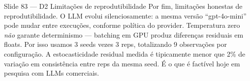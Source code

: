 \documentclass[aspectratio=169,10pt]{beamer}
\begin{document}
\begin{frame}{Slide 83 --- D2 Limita\c{c}\~oes de reprodutibilidade}
\footnotesize
Por fim, limita\c{c}\~oes honestas de reprodutibilidade. O LLM evolui silenciosamente: a mesma vers\~ao ``gpt-4o-mini'' pode mudar entre execu\c{c}\~oes, conforme pol\'itica do provider. Temperatura zero \emph{n\~ao} garante determinismo --- batching em GPU produz diferen\c{c}as residuais em floats. Por isso usamos 3 seeds vezes 3 reps, totalizando 9 observa\c{c}\~oes por configura\c{c}\~ao. A estocasticidade residual medida \'e tipicamente menor que 2\% de varia\c{c}\~ao em consist\^encia entre reps da mesma seed. \'E o que \'e fact\'ivel hoje em pesquisa com LLMs comerciais.
\end{frame}
\end{document}
